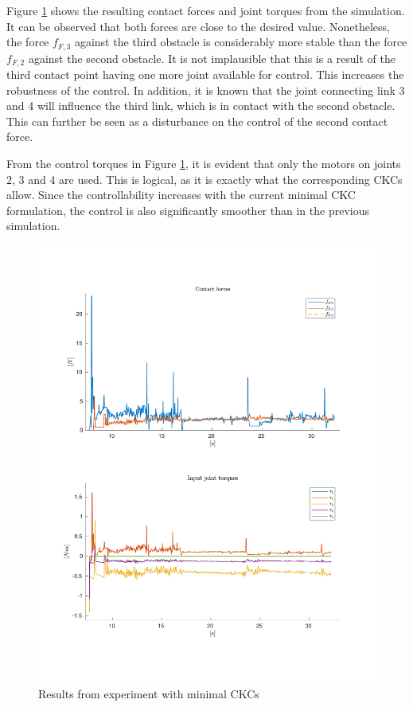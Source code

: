 Figure \ref{fig:2xf-miniJ} shows the resulting contact forces and joint torques from the simulation. It can be observed that both forces are close to the desired value. Nonetheless, the force $f_{F,3}$ against the third obstacle is considerably more stable than the force $f_{F,2}$ against the second obstacle. It is not implausible that this is a result of the third contact point having one more joint available for control. This increases the robustness of the control. In addition, it is known that the joint connecting link 3 and 4 will influence the third link, which is in contact with the second obstacle. This can further be seen as a disturbance on the control of the second contact force.

From the control torques in Figure \ref{fig:2xf-miniJ}, it is evident that only the motors on joints 2, 3 and 4 are used. This is logical, as it is exactly what the corresponding CKCs allow. Since the controllability increases with the current minimal CKC formulation, the control is also significantly smoother than in the previous simulation.

\begin{figure}[H]
    \centering
    \includegraphics[trim=1.5cm 2cm 2cm 2cm, clip=true, width=\textwidth]{figures/experiments/2xf/miniJ-2plot.pdf}
    \caption{Results from experiment with minimal CKCs}
    \label{fig:2xf-miniJ}
\end{figure}



